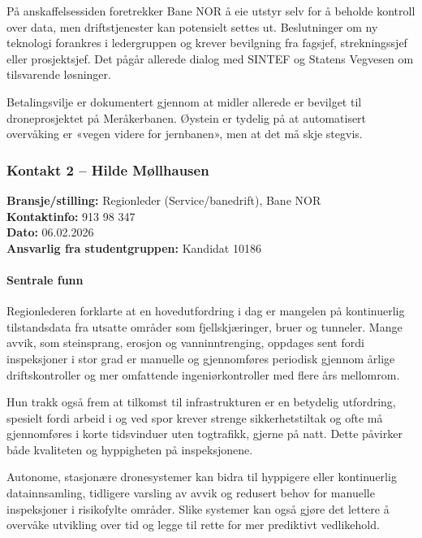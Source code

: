 På anskaffelsessiden foretrekker Bane NOR å eie utstyr selv for å beholde kontroll over data, men driftstjenester kan potensielt settes ut. Beslutninger om ny teknologi forankres i ledergruppen og krever bevilgning fra fagsjef, strekningssjef eller prosjektsjef. Det pågår allerede dialog med SINTEF og Statens Vegvesen om tilsvarende løsninger.

Betalingsvilje er dokumentert gjennom at midler allerede er bevilget til droneprosjektet på Meråkerbanen. Øystein er tydelig på at automatisert overvåking er «vegen videre for jernbanen», men at det må skje stegvis.

\subsubsection{Kontakt 2  – Hilde Møllhausen}
\label{kontakt:mollhausen}

\textbf{Bransje/stilling:} Regionleder (Service/banedrift), Bane NOR \\
\textbf{Kontaktinfo:} 913 98 347 \\
\textbf{Dato:} 06.02.2026 \\
\textbf{Ansvarlig fra studentgruppen:} Kandidat 10186

\paragraph{Sentrale funn}

Regionlederen forklarte at en hovedutfordring i dag er mangelen på kontinuerlig tilstandsdata fra utsatte områder som fjellskjæringer, bruer og tunneler. Mange avvik, som steinsprang, erosjon og vanninntrenging, oppdages sent fordi inspeksjoner i stor grad er manuelle og gjennomføres periodisk gjennom årlige driftskontroller og mer omfattende ingeniørkontroller med flere års mellomrom.

Hun trakk også frem at tilkomst til infrastrukturen er en betydelig utfordring, spesielt fordi arbeid i og ved spor krever strenge sikkerhetstiltak og ofte må gjennomføres i korte tidsvinduer uten togtrafikk, gjerne på natt. Dette påvirker både kvaliteten og hyppigheten på inspeksjonene.

Autonome, stasjonære dronesystemer kan bidra til hyppigere eller kontinuerlig datainnsamling, tidligere varsling av avvik og redusert behov for manuelle inspeksjoner i risikofylte områder. Slike systemer kan også gjøre det lettere å overvåke utvikling over tid og legge til rette for mer prediktivt vedlikehold.

